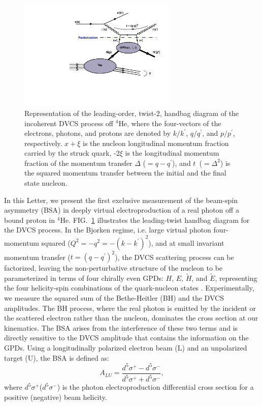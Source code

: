 \documentclass[twocolumn,nofootinbib,showpacs,prl,superscriptaddress,secnumarabic,amssymb,nobibnotes,aps,floatfix]{revtex4}
\begin{document}
\begin{figure}[tb]
\includegraphics[width=7.5cm]{figs/handbag_incoherent.pdf}
\caption{Representation of the leading-order, twist-2, handbag diagram of the 
   incoherent DVCS process off $^4$He, where the four-vectors of the electrons, 
   photons, and protons are denoted by $k/k^\prime$, $q/q^\prime$, and 
   $p/p^\prime$, respectively. $x+\xi$ is the nucleon longitudinal momentum 
   fraction carried by the struck quark, -2$\xi$ is the longitudinal momentum 
   fraction of the momentum transfer $\Delta$ ($= q - q^\prime$), and 
   $t$~($=\Delta^2$) is the squared momentum transfer between the initial and
   the final state nucleon.}
\label{fig:diags}
\end{figure}

In this Letter, we present the first exclusive measurement of the beam-spin 
asymmetry (BSA) in deeply virtual electroproduction of a real photon off a bound 
proton in $^{4}$He. FIG.~\ref{fig:diags} illustrates the leading-twist handbag 
diagram for the DVCS process. In the Bjorken regime, i.e. large virtual photon 
four-momentum squared ($Q^{2}=-q^2=-(k-k^\prime)^2$), and at small invariant 
momentum transfer ($t=(q-q^\prime)^2$), the DVCS scattering process can be 
factorized, leaving the non-perturbative structure of the nucleon to be 
parameterized in terms of four chirally even GPDs: $H$, $E$, $\widetilde{H}$, 
and $\widetilde{E}$, representing the four helicity-spin combinations of the 
quark-nucleon states \cite{Freund_Collins,Ji_Osborne}. Experimentally, we 
measure the squared sum of the Bethe-Heitler (BH) and the DVCS amplitudes. The 
BH process, where the real photon is emitted by the incident or the scattered 
electron rather than the nucleon, dominates the cross section at our 
kinematics. The BSA arises from the interference of these two terms and is 
directly sensitive to the DVCS amplitude that contains the information on the 
GPDs. Using a longitudinally polarized electron beam (L) and an unpolarized 
target (U), the BSA is defined as:
\begin{equation}
  A_{LU} = \frac{d^{5}\sigma^{+} - d^{5}\sigma^{-} }
                {d^{5}\sigma^{+} + d^{5}\sigma^{-}},
    \label{BSA_equation}
  \end{equation}
where $d^{5}\sigma^{+}$($d^{5}\sigma^{-}$) is the photon electroproduction 
differential cross section for a positive (negative) beam helicity. 
\end{document}
